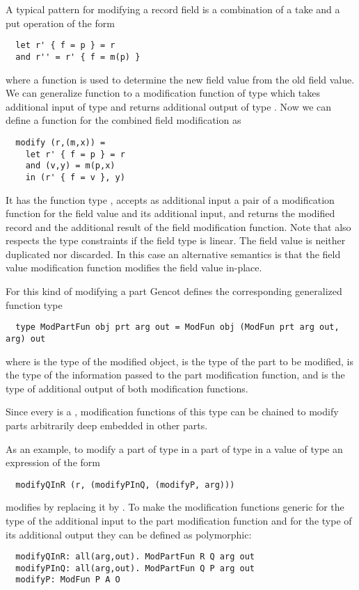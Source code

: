 A typical pattern for modifying a record field is a combination of a take and a put operation of the form
\begin{verbatim}
  let r' { f = p } = r 
  and r'' = r' { f = m(p) }
\end{verbatim}
where a function  is used to determine the new field value from the old field value. We can generalize function
 to a modification function of type  which takes additional input of type  and
returns additional output of type . Now we can define a function for the combined field modification as
\begin{verbatim}
  modify (r,(m,x)) = 
    let r' { f = p } = r
    and (v,y) = m(p,x)
    in (r' { f = v }, y)
\end{verbatim}
It has the function type , accepts as additional input a pair of a modification
function for the field value and its additional input, and returns the modified record and the additional result of
the field modification function. Note that  also respects the type constraints if the field type 
is linear. The field value is neither duplicated nor discarded. In this case an alternative semantics is that the field 
value modification function  modifies the field value in-place.

For this kind of modifying a part Gencot defines the corresponding generalized function type
\begin{verbatim}
  type ModPartFun obj prt arg out = ModFun obj (ModFun prt arg out, arg) out
\end{verbatim}
where  is the type of the modified object,  is the type of the part to be modified,  is the type
of the information passed to the part modification function, and  is the type of additional output of both modification functions.

Since every  is a , modification functions of this type can be chained to modify parts arbitrarily 
deep embedded in other parts. 

As an example, to modify a part  of type  in a part  of type  in a value  of type 
an expression of the form
\begin{verbatim}
  modifyQInR (r, (modifyPInQ, (modifyP, arg)))
\end{verbatim}
modifies  by replacing it by . To make the modification functions generic for the type of the additional input
to the part modification function and for the type of its additional output they can be defined as polymorphic:
\begin{verbatim}
  modifyQInR: all(arg,out). ModPartFun R Q arg out
  modifyPInQ: all(arg,out). ModPartFun Q P arg out
  modifyP: ModFun P A O
\end{verbatim}

